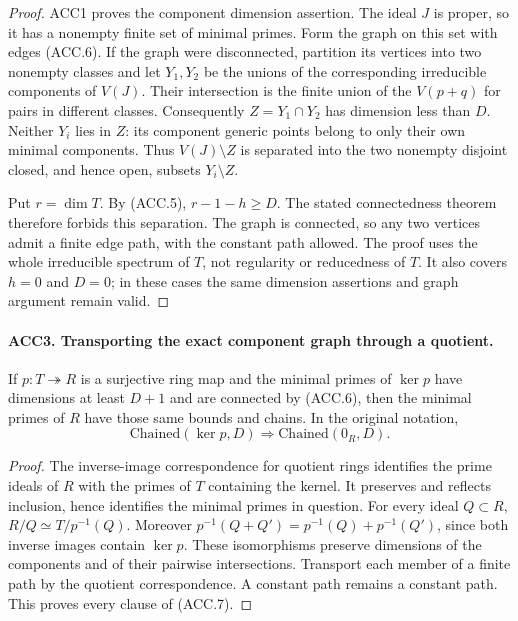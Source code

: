 \documentclass[11pt,a4paper]{article}
\numberwithin{equation}{section}
\theoremstyle{remark}\newtheorem{remark}[theorem]{Remark}
\begin{document}
\begin{proof}
ACC1 proves the component dimension assertion.  The ideal \(J\)
is proper, so it has a nonempty finite set of minimal primes.
Form the graph on this set with edges (ACC.6).  If the graph were
disconnected, partition its vertices into two nonempty classes and
let \(Y_1,Y_2\) be the unions of the corresponding irreducible
components of \(V(J)\).  Their intersection is the finite union
of the \(V(p+q)\) for pairs in different classes.  Consequently
\(Z=Y_1\cap Y_2\) has dimension less than \(D\).
Neither \(Y_i\) lies in \(Z\): its component generic points
belong to only their own minimal components.  Thus
\(V(J)\setminus Z\) is separated into the two nonempty disjoint
closed, and hence open, subsets \(Y_i\setminus Z\).

Put \(r=\dim T\).  By (ACC.5), \(r-1-h\ge D\).
The stated connectedness theorem therefore forbids this separation.
The graph is connected, so any two vertices admit a finite edge
path, with the constant path allowed.  The proof uses the whole
irreducible spectrum of \(T\), not regularity or reducedness of
\(T\).  It also covers \(h=0\) and \(D=0\); in these cases
the same dimension assertions and graph argument remain valid.
\end{proof}

\paragraph{ACC3. Transporting the exact component graph through a quotient.}
\label{claim:ACC3}
If \(p:T\twoheadrightarrow R\) is a surjective ring map and
the minimal primes of \(\ker p\) have dimensions at least
\(D+1\) and are connected by (ACC.6), then the minimal primes of
\(R\) have those same bounds and chains.  In the original notation,
\[
             \mathrm{Chained}(\ker p,D)
                 \Longrightarrow \mathrm{Chained}(0_R,D).
                                                               \tag{ACC.7}
\]

\begin{proof}
The inverse-image correspondence for quotient rings identifies the
prime ideals of \(R\) with the primes of \(T\) containing the
kernel.  It preserves and reflects inclusion, hence identifies the
minimal primes in question.  For every ideal \(Q\subset R\),
\(R/Q\simeq T/p^{-1}(Q)\).  Moreover
\(p^{-1}(Q+Q')=p^{-1}(Q)+p^{-1}(Q')\), since both inverse images
contain \(\ker p\).  These isomorphisms preserve dimensions of
the components and of their pairwise intersections.  Transport each
member of a finite path by the quotient correspondence.  A constant
path remains a constant path.  This proves every clause of (ACC.7).
\end{proof}
\end{document}
